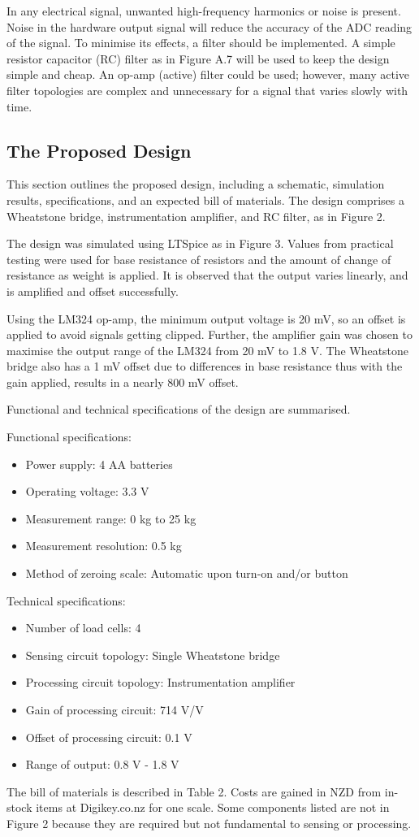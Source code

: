 In any electrical signal, unwanted high-frequency harmonics or noise is present. Noise in the hardware output signal will reduce the accuracy of the ADC reading of the signal. To minimise its effects, a filter should be implemented. A simple resistor capacitor (RC) filter  as in Figure A.7 will be used to keep the design simple and cheap. An op-amp (active) filter could be used; however, many active filter topologies are complex and unnecessary for a signal that varies slowly with time.

\subsection{The Proposed Design}
This section outlines the proposed design, including a schematic, simulation results, specifications, and an expected bill of materials.
The design comprises a Wheatstone bridge, instrumentation amplifier, and RC filter, as in Figure 2.

The design was simulated using LTSpice as in Figure 3. Values from practical testing were used for base resistance of resistors and the amount of change of resistance as weight is applied. It is observed that the output varies linearly, and is amplified and offset successfully.

Using the LM324 op-amp, the minimum output voltage is 20 mV, so an offset is applied to avoid signals getting clipped. Further, the amplifier gain was chosen to maximise the output range of the LM324 from 20 mV to 1.8 V. The Wheatstone bridge also has a 1 mV offset due to differences in base resistance thus with the gain applied, results in a nearly 800 mV offset.

Functional and technical specifications of the design are summarised.

Functional specifications:
\begin{itemize}
    \item Power supply:	4 AA batteries
    \item Operating voltage:	3.3 V
    \item Measurement range:	0 kg to 25 kg
    \item Measurement resolution: 	0.5 kg
    \item Method of zeroing scale:	Automatic upon turn-on and/or button
\end{itemize}

Technical specifications:
\begin{itemize}
    \item Number of load cells:	4
    \item Sensing circuit topology:	Single Wheatstone bridge
    \item Processing circuit topology:	Instrumentation amplifier
    \item Gain of processing circuit:	714 V/V
    \item Offset of processing circuit:	0.1 V
    \item Range of output:               	0.8 V - 1.8 V
\end{itemize}

The bill of materials is described in Table 2. Costs are gained in NZD from in-stock items at Digikey.co.nz for one scale. Some components listed are not in Figure 2 because they are required but not fundamental to sensing or processing.
